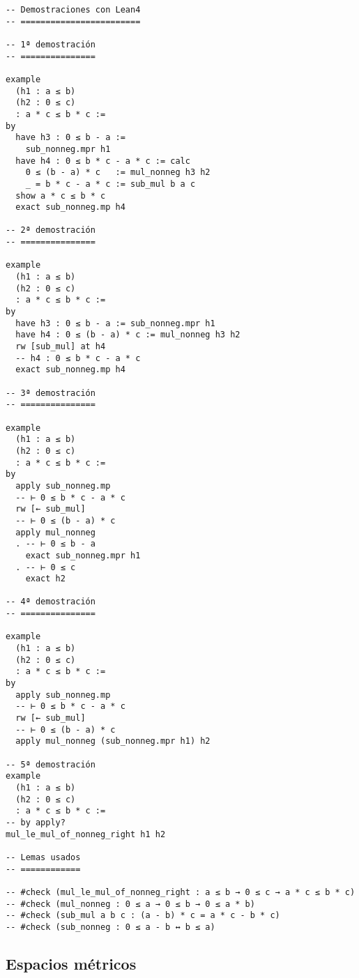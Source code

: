 \begin{verbatim}
-- Demostraciones con Lean4
-- ========================

-- 1ª demostración
-- ===============

example
  (h1 : a ≤ b)
  (h2 : 0 ≤ c)
  : a * c ≤ b * c :=
by
  have h3 : 0 ≤ b - a :=
    sub_nonneg.mpr h1
  have h4 : 0 ≤ b * c - a * c := calc
    0 ≤ (b - a) * c   := mul_nonneg h3 h2
    _ = b * c - a * c := sub_mul b a c
  show a * c ≤ b * c
  exact sub_nonneg.mp h4

-- 2ª demostración
-- ===============

example
  (h1 : a ≤ b)
  (h2 : 0 ≤ c)
  : a * c ≤ b * c :=
by
  have h3 : 0 ≤ b - a := sub_nonneg.mpr h1
  have h4 : 0 ≤ (b - a) * c := mul_nonneg h3 h2
  rw [sub_mul] at h4
  -- h4 : 0 ≤ b * c - a * c
  exact sub_nonneg.mp h4

-- 3ª demostración
-- ===============

example
  (h1 : a ≤ b)
  (h2 : 0 ≤ c)
  : a * c ≤ b * c :=
by
  apply sub_nonneg.mp
  -- ⊢ 0 ≤ b * c - a * c
  rw [← sub_mul]
  -- ⊢ 0 ≤ (b - a) * c
  apply mul_nonneg
  . -- ⊢ 0 ≤ b - a
    exact sub_nonneg.mpr h1
  . -- ⊢ 0 ≤ c
    exact h2

-- 4ª demostración
-- ===============

example
  (h1 : a ≤ b)
  (h2 : 0 ≤ c)
  : a * c ≤ b * c :=
by
  apply sub_nonneg.mp
  -- ⊢ 0 ≤ b * c - a * c
  rw [← sub_mul]
  -- ⊢ 0 ≤ (b - a) * c
  apply mul_nonneg (sub_nonneg.mpr h1) h2

-- 5ª demostración
example
  (h1 : a ≤ b)
  (h2 : 0 ≤ c)
  : a * c ≤ b * c :=
-- by apply?
mul_le_mul_of_nonneg_right h1 h2

-- Lemas usados
-- ============

-- #check (mul_le_mul_of_nonneg_right : a ≤ b → 0 ≤ c → a * c ≤ b * c)
-- #check (mul_nonneg : 0 ≤ a → 0 ≤ b → 0 ≤ a * b)
-- #check (sub_mul a b c : (a - b) * c = a * c - b * c)
-- #check (sub_nonneg : 0 ≤ a - b ↔ b ≤ a)
\end{verbatim}

\subsection{Espacios métricos}
\label{sec:org8988456}

